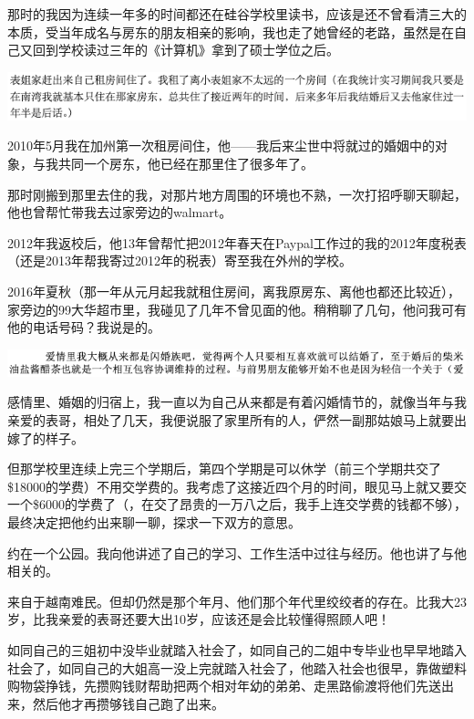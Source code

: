 \documentclass[9pt, b5paper]{article}
\begin{document}
那时的我因为连续一年多的时间都还在硅谷学校里读书，应该是还不曾看清三大的本质，受当年成名与房东的朋友相亲的影响，我也走了她曾经的老路，虽然是在自己又回到学校读过三年的《计算机》拿到了硕士学位之后。

\begin{center}
\includegraphics[width=.9\linewidth]{./pic/backups_plans_20210423_202941.png}
\end{center}

2010年5月我在加州第一次租房间住，他——我后来尘世中将就过的婚姻中的对象，与我共同一个房东，他已经在那里住了很多年了。 

那时刚搬到那里去住的我，对那片地方周围的环境也不熟，一次打招呼聊天聊起，他也曾帮忙带我去过家旁边的walmart。

2012年我返校后，他13年曾帮忙把2012年春天在Paypal工作过的我的2012年度税表（还是2013年帮我寄过2012年的税表）寄至我在外州的学校。

2016年夏秋（那一年从元月起我就租住房间，离我原房东、离他也都还比较近），家旁边的99大华超市里，我碰见了几年不曾见面的他。稍稍聊了几句，他问我可有他的电话号码？我说是的。

\begin{center}
\includegraphics[width=.9\linewidth]{./pic/backups_plans_20210423_203401.png}
\end{center}

感情里、婚姻的归宿上，我一直以为自己从来都是有着闪婚情节的，就像当年与我亲爱的表哥，相处了几天，我便说服了家里所有的人，俨然一副那姑娘马上就要出嫁了的样子。

但那学校里连续上完三个学期后，第四个学期是可以休学（前三个学期共交了\$18000的学费）不用交学费的。我考虑了这接近四个月的时间，眼见马上就又要交一个\$6000的学费了（，在交了昂贵的一万八之后，我手上连交学费的钱都不够），最终决定把他约出来聊一聊，探求一下双方的意思。

约在一个公园。我向他讲述了自己的学习、工作生活中过往与经历。他也讲了与他相关的。 

来自于越南难民。但却仍然是那个年月、他们那个年代里绞绞者的存在。比我大23岁，比我亲爱的表哥还要大出10岁，应该还是会比较懂得照顾人吧！

如同自己的三姐初中没毕业就踏入社会了，如同自己的二姐中专毕业也早早地踏入社会了，如同自己的大姐高一没上完就踏入社会了，他踏入社会也很早，靠做塑料购物袋挣钱，先攒购钱财帮助把两个相对年幼的弟弟、走黑路偷渡将他们先送出来，然后他才再攒够钱自己跑了出来。
\end{document}
